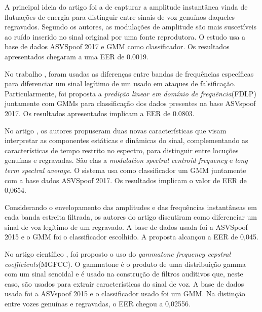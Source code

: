 		\par A principal ideia do artigo \cite{ISI:000465363900136} foi a de capturar a amplitude instantânea vinda de flutuações de energia para distinguir entre sinais de voz genuínos daqueles regravados. Segundo os autores, as modulações de amplitude são mais suscetíveis ao ruído inserido no sinal original por uma fonte reprodutora. O estudo usa a base de dados ASVSpoof 2017 e GMM como classificador. Os resultados apresentados chegaram a uma EER de 0.0019.

		\par No trabalho \cite{ISI:000465363900139}, foram usadas as diferenças entre bandas de frequências específicas para diferenciar um sinal legítimo de um usado em ataques de falsificação. Particularmente, foi proposta a \textit{predição linear em domínio de frequência}(FDLP) juntamente com GMMs para classificação dos dados presentes na base ASVspoof  2017. Os resultados apresentados implicam a EER de 0.0803.
		
		\par No artigo \cite{Suthokumar2018}, os autores propuseram duas novas características que visam interpretar as componentes estáticas e dinâmicas do sinal, complementando as características de tempo restrito no espectro, para distinguir entre locuções genuínas e regravadas. São elas a \textit{modulation  spectral  centroid  frequency} e \textit{long term spectral average}. O sistema usa como classificador um GMM juntamente com a base dados ASVSpoof 2017. Os resultados implicam o valor de EER de 0,0654.
		
		\par Considerando o envelopamento das amplitudes e das frequências instantâneas em cada banda estreita filtrada, os autores do artigo \cite{ISI:000458728700054} discutiram como diferenciar um sinal de voz legítimo de um regravado. A base de dados usada foi a  ASVSpoof 2015 e o GMM foi o classificador escolhido. A proposta alcançou a EER de 0,045.

		\par No artigo científico \cite{ISI:000392503100008}, foi proposto o uso do \textit{gammatone frequency cepstral coefficients}(MGFCC). O gammatone é o produto de uma distribuição gamma com um sinal senoidal e é usado na construção de filtros auditivos que, neste caso, são usados para extrair características do sinal de voz. A base de dados usada foi a ASVspoof 2015 e o classificador usado foi um GMM. Na distinção entre vozes genuínas e regravadas, o EER chegou a 0,02556.
		
